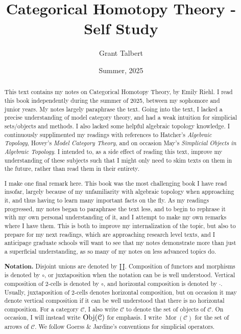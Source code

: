 \documentclass[11pt, letterpaper]{report}
\title{Categorical Homotopy Theory - Self Study}
\date{Summer, 2025}
\author{Grant Talbert}
\begin{document}
\maketitle
\begin{abstract}
	This text contains my notes on Categorical Homotopy Theory, by Emily Riehl. I read this book independently during the summer of 2025, between my sophomore and junior years. My notes largely paraphrase the text. Going into the text, I lacked a precise understanding of model category theory, and had a weak intuition for simplicial sets/objects and methods. I also lacked some helpful algebraic topology knowledge. I continuously supplimented my readings with references to Hatcher's \emph{Algebraic Topology}, Hovey's \emph{Model Category Theory}, and on occasion May's \emph{Simplicial Objects in Algebraic Topology}. I intended to, as a side effect of reading this text, improve my understanding of these subjects such that I might only need to skim texts on them in the future, rather than read them in their entirety.

	I make one final remark here. This book was the most challenging book I have read insofar, largely because of my unfamiliarity with algebraic topology when approaching it, and thus having to learn many important facts on the fly. As my readings progressed, my notes began to paraphrase the text less, and to begin to rephrase it with my own personal understanding of it, and I attempt to make my own remarks where I have them. This is both to improve my internalization of the topic, but also to prepare for my next readings, which are approaching research level texts, and I anticipage graduate schools will want to see that my notes demonstrate more than just a superficial understanding, as so many of my notes on less advanced topics do.

	\textbf{\color{accentblue}Notation.} Disjoint unions are denoted by $\amalg$. Composition of functors and morphisms is denoted by $\circ $, or juxtaposition when the notation can be is well understood. Vertical composition of 2-cells is denoted by $\circ $, and horizontal composition is denoted by $\cdot $. Usually, juxtaposition of 2-cells denotes horizontal composition, but on occasion it may denote vertical composition if it can be well understood that there is no horizontal composition. For a category $\mathcal{C} $, I also write $\mathcal{C} $ to denote the set of objects of $\mathcal{C} $. On occasion, I will instead write $\operatorname{Obj}(\mathcal{C} ) $ for emphasis. I write $\operatorname{Mor} (\mathcal{C} )$ for the set of arrows of $\mathcal{C} $. We follow Goerss \& Jardine's conventions for simplicial operators.
\end{abstract}
\tableofcontents
\end{document}
